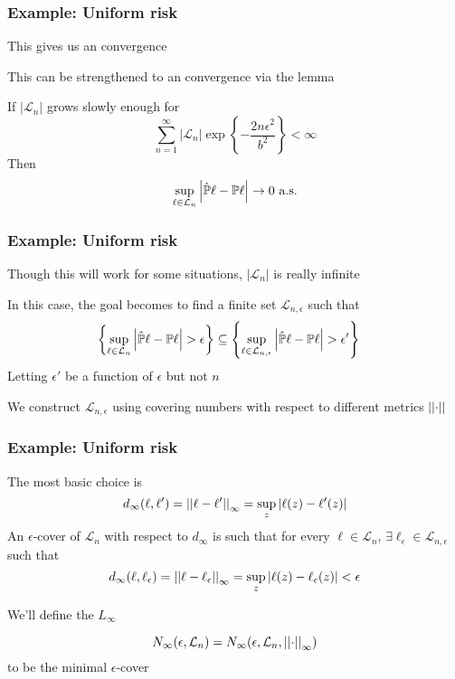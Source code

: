 \documentclass[12pt]{beamer}
\begin{document}
\begin{frame}[fragile]
\frametitle{Example: Uniform risk }
This gives us an  convergence

\vsp
This can be strengthened to an  convergence via the  lemma

\vsp
If $|\mathcal{L}_n|$ grows slowly enough for
\[
\sum_{n=1}^\infty |\mathcal{L}_n| \exp\left\{ -\frac{2n\epsilon^2}{b^2}\right\} < \infty
\]
Then
\[
\sup_{\ell \in \mathcal{L}_n} \left| \hat\P\ell - \P\ell \right| \rightarrow 0 \textrm{ a.s.}
\]
\end{frame}

\begin{frame}[fragile]
\frametitle{Example: Uniform risk }
Though this will work for some situations, $|\mathcal{L}_n|$ is really infinite

\vsp
In this case, the goal becomes to find a finite set $\mathcal{L}_{n,\epsilon}$ such that
\begin{align*}
\left\{ \sup_{\ell \in \mathcal{L}_n} \left| \hat\P\ell - \P\ell \right| > \epsilon \right\} & \subseteq
\left\{ \sup_{\ell \in \mathcal{L}_{n,\epsilon}} \left| \hat\P\ell - \P\ell \right| > \epsilon' \right\}
\end{align*}
Letting $\epsilon'$ be a function of $\epsilon$ but not $n$

\vsp
We construct $\mathcal{L}_{n,\epsilon}$ using covering numbers with respect to different metrics $\norm{\cdot}$

\end{frame}

\begin{frame}[fragile]
\frametitle{Example: Uniform risk }
The most  basic choice is 
\[
d_{\infty}(\ell,\ell') = \norm{\ell - \ell'}_{\infty} = \sup_z| \ell(z) - \ell'(z)|
\]
An $\epsilon$-cover of $\mathcal{L}_n$ with respect to $d_{\infty}$ is such that for every $\ell \in \mathcal{L}_n$,
$\exists \ell_{\epsilon} \in \mathcal{L}_{n,\epsilon}$ such that
\[
d_{\infty}(\ell,\ell_\epsilon) = \norm{\ell - \ell_\epsilon}_{\infty} = \sup_z| \ell(z) - \ell_\epsilon(z)| < \epsilon
\]

\vsp
We'll define the $L_{\infty}$  

\[
N_\infty(\epsilon,\mathcal{L}_n) = N_\infty(\epsilon,\mathcal{L}_n,\norm{\cdot}_\infty)
\]
to be the minimal $\epsilon$-cover


\end{frame}
\end{document}
